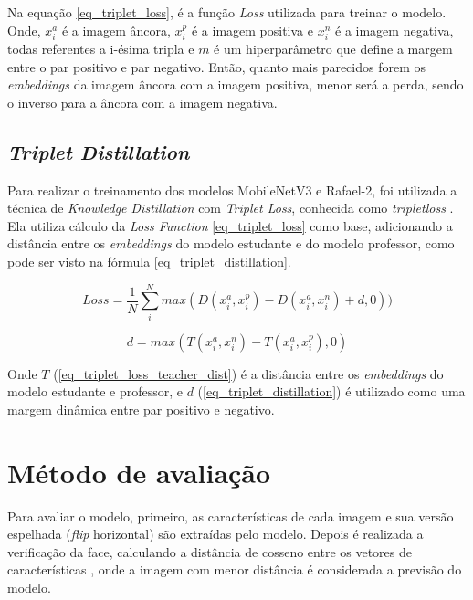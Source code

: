 Na equação \ref{eq_triplet_loss}, é a função \textit{Loss} utilizada para treinar o modelo. Onde, $x_i^a$ é
a imagem âncora, $x_i^p$ é a imagem positiva e $x_i^n$ é a imagem negativa, todas referentes a i-ésima
tripla e $m$ é um hiperparâmetro que define a margem entre o par positivo e par negativo.
Então, quanto mais parecidos forem os \textit{embeddings} da imagem âncora com a imagem positiva,
menor será a perda, sendo o inverso para a âncora com a imagem negativa.

\subsection{\textit{Triplet Distillation}}
Para realizar o treinamento dos modelos MobileNetV3 e Rafael-2, foi utilizada a técnica de
\textit{Knowledge Distillation} \cite{hinton2015distilling} com \textit{Triplet Loss}, conhecida como
\textit{tripletloss} \cite{triplet_distillation_face_recognition}.
Ela utiliza cálculo da \textit{Loss Function} \ref{eq_triplet_loss} como base, adicionando a distância entre os
\textit{embeddings} do modelo estudante e do modelo professor, como pode ser visto na fórmula
\ref{eq_triplet_distillation}.

\begin{equation}\label{eq_triplet_distillation}
	Loss = \frac 1 N \sum _i ^N max(D(x_i^a, x_i^p) - D(x_i^a, x_i^n) + d, 0))
\end{equation}

\begin{equation}\label{eq_triplet_loss_teacher_dist}
	d = max(T(x_i^a, x_i^n) - T(x_i^a, x_i^p), 0)
\end{equation}

Onde $T$ (\ref{eq_triplet_loss_teacher_dist}) é a distância entre os \textit{embeddings} do modelo estudante e
professor, e $d$ (\ref{eq_triplet_distillation}) é utilizado como uma margem dinâmica entre par positivo e negativo.


\section{Método de avaliação}\label{sec_avaliacao_modelo}
Para avaliar o modelo, primeiro, as características de cada imagem e sua versão espelhada
(\textit{flip} horizontal) são extraídas pelo modelo. Depois é realizada a verificação da face,
calculando a distância de cosseno entre os vetores de características
\cite{triplet_distillation_face_recognition}, onde a imagem com menor distância é considerada a previsão do
modelo.

